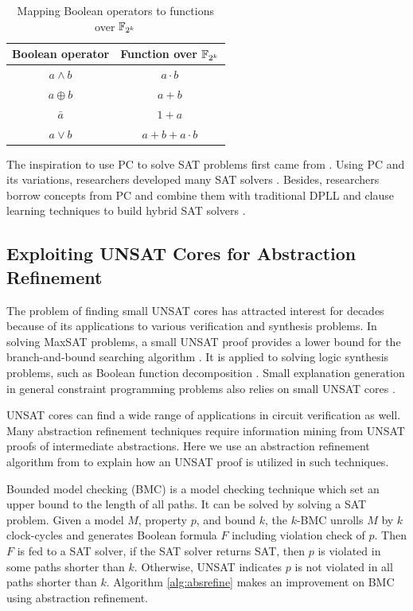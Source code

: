 \begin{table}[bp]
\caption{Mapping Boolean operators to functions over ${\mathbb{F}}_{2^k}$}
\centering
\begin{tabular}{|c|c|} 
\hline
 Boolean operator & Function over ${\mathbb{F}}_{2^k}$ \\
\hline
\hline
 $a\land b$ & $a\cdot b$ \\
\hline
 $a\oplus b$ & $a+b$ \\
\hline
 $\bar{a}$ & $1+a$ \\
\hline
 $a\lor b$ & $a+b+a\cdot b$\\
\hline
\end{tabular}
\label{tab:booltof4}  
\end{table}

The inspiration to use PC to solve SAT problems first came from \cite{ceiSTOC96}.
Using PC and its variations, researchers developed many SAT solvers \cite{STABLE,BLUEVERI,PolyBoRi}. 
Besides, researchers borrow concepts from PC and combine them with traditional DPLL and clause learning techniques
to build hybrid SAT solvers \cite{condratTACAS07,Zengler2010}.

\subsection{Exploiting UNSAT Cores for Abstraction Refinement}
The problem of finding small UNSAT cores has attracted interest for decades because of 
its applications to various verification and synthesis problems.
In solving MaxSAT problems, a small UNSAT proof provides a lower bound for the branch-and-bound searching algorithm \cite{li2009maxsat}.
It is applied to solving logic synthesis problems, such as Boolean function decomposition \cite{lee2008bi}. 
Small explanation generation in general constraint programming problems also relies on small UNSAT cores \cite{cambazard2008reformulating}.

UNSAT cores can find a wide range of applications in circuit verification as well. Many abstraction refinement techniques require 
information mining from UNSAT proofs of intermediate abstractions. 
Here we use an abstraction refinement algorithm from \cite{zhang2005design} to explain how an UNSAT proof is
utilized in such techniques.

Bounded model checking (BMC) is a model checking technique which set an upper bound to the length of all paths. 
It can be solved by solving a SAT problem. Given a model $M$, property $p$, and bound $k$, 
the $k$-BMC unrolls $M$ by $k$ clock-cycles and generates Boolean formula $F$ including violation check of $p$.
Then $F$ is fed to a SAT solver, if the SAT solver returns SAT, then $p$ is violated in 
some paths shorter than $k$. Otherwise, UNSAT indicates $p$ is not violated in all paths 
shorter than $k$. Algorithm \ref{alg:absrefine} makes an improvement on BMC using 
abstraction refinement.

